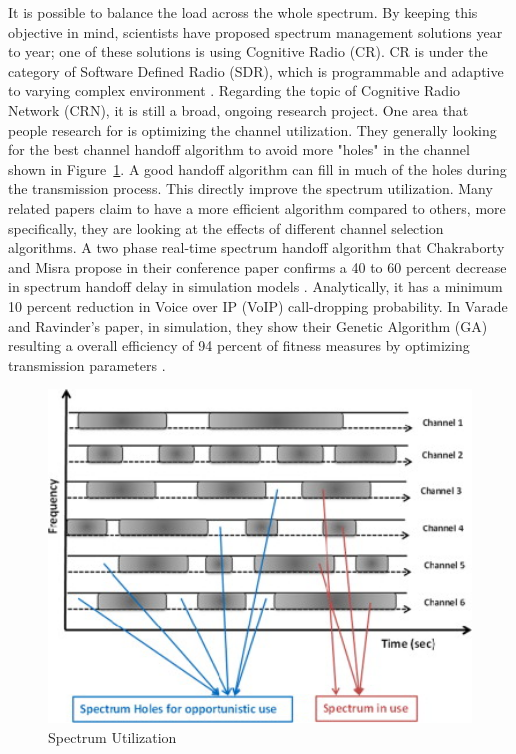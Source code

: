 It is possible to balance the load across the whole spectrum. By keeping this objective in mind, scientists have proposed spectrum 
management solutions year to year; one of these solutions is using Cognitive Radio (CR). CR is under the category of Software Defined Radio 
(SDR), which is programmable and adaptive to varying complex environment \cite{software_defined_radio}. Regarding the topic of Cognitive Radio Network (CRN), it is still a broad, ongoing research project. One area that people research for is optimizing the channel utilization. They generally looking for the best channel handoff algorithm to avoid more "holes" in the channel shown in Figure~\ref{fig:channel_hole}. A good handoff algorithm can fill in much of the holes during the transmission process. This directly improve the spectrum utilization. Many related papers claim to have a 
more efficient algorithm compared to others, more specifically, they are looking at the effects of different channel 
selection algorithms. A two phase real-time spectrum handoff algorithm that Chakraborty and Misra propose in their conference paper confirms a 40 to 60 percent decrease in spectrum handoff delay in simulation models \cite{real_time_spectrum}. Analytically, it has a minimum 10 percent reduction in Voice over IP (VoIP) call-dropping probability. In Varade and Ravinder's paper, in simulation, they show their Genetic Algorithm (GA) resulting a overall efficiency of 94 percent of fitness measures by optimizing transmission parameters \cite{optimal_spectrum_allocation}.

\begin{figure}[ht]
\centering
\includegraphics[width=12cm]{figures/channel_hole.jpg}
\caption{Spectrum Utilization \cite{idle_channel}}
\label{fig:channel_hole}
\end{figure}

